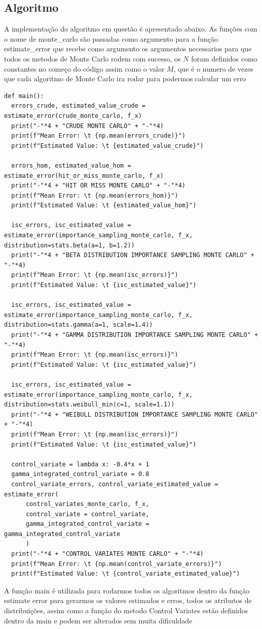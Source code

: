 \documentclass[twocolumn,amsmath,amssymb,floatfix]{revtex4}
\begin{document}
\subsection{Algoritmo}
\indent A implementação do algoritmo em questão é apresentado abaixo. As funções com o nome de monte\_carlo são passadas como argumento para a função estimate\_error que recebe como argumento os argumentos necessarios para que todos os metodos de Monte Carlo rodem com sucesso, os $N$ foram definidos como constantes no começo do código assim como o valor $M$, que é o numero de vezes que cada algoritmo de Monte Carlo ira rodar para podermos calcular um erro
\begin{lstlisting}
def main():
  errors_crude, estimated_value_crude = estimate_error(crude_monte_carlo, f_x)
  print("-"*4 + "CRUDE MONTE CARLO" + "-"*4)
  print(f"Mean Error: \t {np.mean(errors_crude)}")
  print(f"Estimated Value: \t {estimated_value_crude}")

  errors_hom, estimated_value_hom = estimate_error(hit_or_miss_monte_carlo, f_x)
  print("-"*4 + "HIT OR MISS MONTE CARLO" + "-"*4)
  print(f"Mean Error: \t {np.mean(errors_hom)}")
  print(f"Estimated Value: \t {estimated_value_hom}")

  isc_errors, isc_estimated_value = estimate_error(importance_sampling_monte_carlo, f_x, distribution=stats.beta(a=1, b=1.2))
  print("-"*4 + "BETA DISTRIBUTION IMPORTANCE SAMPLING MONTE CARLO" + "-"*4)
  print(f"Mean Error: \t {np.mean(isc_errors)}")
  print(f"Estimated Value: \t {isc_estimated_value}")

  isc_errors, isc_estimated_value = estimate_error(importance_sampling_monte_carlo, f_x, distribution=stats.gamma(a=1, scale=1.4))
  print("-"*4 + "GAMMA DISTRIBUTION IMPORTANCE SAMPLING MONTE CARLO" + "-"*4)
  print(f"Mean Error: \t {np.mean(isc_errors)}")
  print(f"Estimated Value: \t {isc_estimated_value}")

  isc_errors, isc_estimated_value = estimate_error(importance_sampling_monte_carlo, f_x, distribution=stats.weibull_min(c=1, scale=1.1))
  print("-"*4 + "WEIBULL DISTRIBUTION IMPORTANCE SAMPLING MONTE CARLO" + "-"*4)
  print(f"Mean Error: \t {np.mean(isc_errors)}")
  print(f"Estimated Value: \t {isc_estimated_value}")
  
  control_variate = lambda x: -0.4*x + 1
  gamma_integrated_control_variate = 0.8
  control_variate_errors, control_variate_estimated_value = estimate_error(
      control_variates_monte_carlo, f_x, 
      control_variate = control_variate,
      gamma_integrated_control_variate = gamma_integrated_control_variate
      )
  print("-"*4 + "CONTROL VARIATES MONTE CARLO" + "-"*4)
  print(f"Mean Error: \t {np.mean(control_variate_errors)}")
  print(f"Estimated Value: \t {control_variate_estimated_value}")
\end{lstlisting}
\indent A função main é utilizada para rodarmos todos os algoritmos dentro da função estimate error para gerarmos os valores estimados e erros, todos os atributos de distribuições, assim como a função do metodo Control Variates estão definidos dentro da main e podem ser alterados sem muita dificuldade
\end{document}
